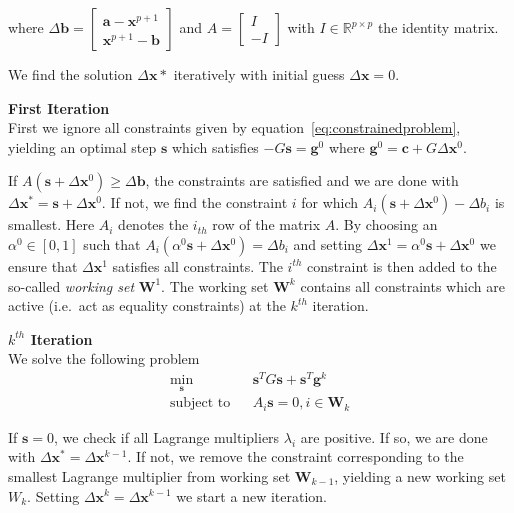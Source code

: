 where $\Delta \mathbf{b} = \left[ \begin{array}{c}
\mathbf{a} - \mathbf{x}^{p+1} \\ \mathbf{x}^{p+1} - \mathbf{b}
\end{array}\right]$
and $A = \left[ \begin{array}{c} I \\ -I \end{array}\right]$ with
$I \in \mathbb{R}^{p \times p}$ the identity matrix.

We find the solution $\Delta \mathbf{x}\ast$ iteratively with initial guess
$\Delta \mathbf{x} = 0$.

{\bf First Iteration}\\
First we ignore all constraints given by equation~\ref{eq:constrainedproblem},
yielding an optimal step $\mathbf{s}$ which satisfies $−G\mathbf{s}
= \mathbf{g}^0$ where $\mathbf{g}^0 = \mathbf{c} + G \Delta \mathbf{x}^0$.

If $A(\mathbf{s} + \Delta \mathbf{x}^0) \geq \Delta \mathbf{b}$, the
constraints are satisfied and we are done with $\Delta \mathbf{x}^\ast
= \mathbf{s} + \Delta \mathbf{x}^0$. If not, we find the constraint $i$ for
which $A_i(\mathbf{s} + \Delta \mathbf{x}^0) - \Delta b_i$ is smallest. Here
$A_i$ denotes the $i_{th}$ row of the matrix $A$. By choosing an $\alpha^0 \in
[0,1]$ such that $A_i (\alpha^0 \mathbf{s} + \Delta \mathbf{x}^0 ) = \Delta
b_i$ and setting $\Delta \mathbf{x}^1 = \alpha^0 \mathbf{s}
+ \Delta \mathbf{x}^0$ we ensure that $\Delta \mathbf{x}^1$ satisfies all
constraints. The $i^{th}$ constraint is then added to the so-called {\it
working set} $\mathbf{W}^1$. The working set $\mathbf{W}^k$ contains all
constraints which are active (i.e.\ act as equality constraints) at the
$k^{th}$ iteration.

{\bf $k^{th}$ Iteration}\\
We solve the following problem
\begin{eqnarray}
\min_{\mathbf{s}} && \mathbf{s}^TG\mathbf{s} + \mathbf{s}^T \mathbf{g}^k \nonumber \\
\textrm{subject to} && A_i \mathbf{s}= 0, i \in \mathbf{W}_k
\end{eqnarray}

If $\mathbf{s} = 0$, we check if all Lagrange multipliers $\lambda_i$ are
positive. If so, we are done with $\Delta \mathbf{x}^\ast
= \Delta \mathbf{x}^{k-1}$. If not, we remove the constraint corresponding to
the smallest Lagrange multiplier from working set $\mathbf{W}_{k-1}$, yielding
a new working set $W_k$. Setting $\Delta \mathbf{x}^k
= \Delta \mathbf{x}^{k-1}$ we start a new iteration.

